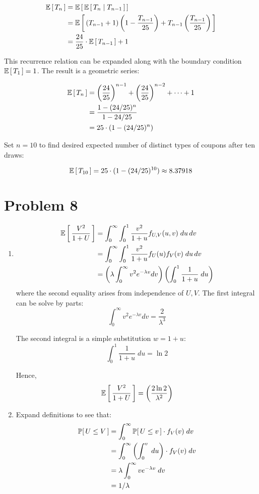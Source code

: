 \documentclass[12pt]{article}%
\begin{document}
\begin{align*}
  \mathbb{E}\left[\,T_n\,\right] & = \mathbb{E}\left[\,\mathbb{E}\left[\,T_n \mid T_{n-1}\,\right]\,\right] \\
  & = \mathbb{E}\left[\,(T_{n-1} + 1)\left(1 - \frac{T_{n-1}}{25}\right) + T_{n-1}\left(\frac{T_{n-1}}{25}\right)\,\right] \\
  & = \frac{24}{25}\cdot\mathbb{E}\left[\,T_{n-1}\,\right] + 1
\end{align*}

This recurrence relation can be expanded along with the boundary condition $\mathbb{E}\left[\,T_1\,\right] = 1$. The result is a geometric series:

\begin{align*}
  \mathbb{E}\left[\,T_n\,\right] & = \left(\frac{24}{25}\right)^{n-1} + \left(\frac{24}{25}\right)^{n-2} + \cdots + 1 \\
    & = \frac{1 - (24/25)^n}{1 - 24/25} \\
    & = 25\cdot (1 - (24/25)^n)
\end{align*}

Set $n = 10$ to find desired expected number of distinct types of coupons after ten draws:

\[ \mathbb{E}\left[\,T_{10}\,\right] = 25\cdot (1 - (24/25)^{10}) \approx 8.37918\]

\section{Problem 8}
\begin{enumerate}
  \item
  \begin{align*}
      \mathbb{E}\left[\,\frac{V^2}{1 + U}\,\right] & = \int_{0}^\infty\int_{0}^1 \frac{v^2}{1 + u} f_{U,V}(u,v) \; du \, dv \\
      & = \int_{0}^\infty\int_{0}^1 \frac{v^2}{1 + u} f_{U}(u)f_V(v) \; du \, dv \\
      & = \left(\lambda \int_0^\infty v^2 e^{-\lambda v} dv  \right)\left(\int_0^1 \frac{1}{1 + u} \; du\right)
  \end{align*}
  where the second equality arises from independence of $U,V$.
  The first integral can be solve by parts:
  \[\int_0^\infty v^2 e^{-\lambda v} dv = \frac{2}{\lambda^3} \]

  The second integral is a simple substitution $w = 1 + u$:
  \[ \int_0^1 \frac{1}{1 + u} \; du  = \ln{2}\]

  Hence,
  \[\mathbb{E}\left[\,\frac{V^2}{1 + U}\,\right] = \left(\frac{2\ln{2}}{\lambda^2}\right)\]

  \item
  Expand definitions to see that:
  \begin{align*}
    \mathbb{P}[\,U \leq V\,]
    & = \int_{0}^\infty \mathbb{P}[\,U \leq v\,]\cdot f_V(v) \; dv \\
    & = \int_0^\infty \left(\int_0^v  \; du\right) \cdot f_V(v) \; dv \\
    & = \lambda \int_0^\infty v e^{-\lambda v} \; dv \\
    & = 1/\lambda
  \end{align*}
\end{enumerate}
\end{document}

